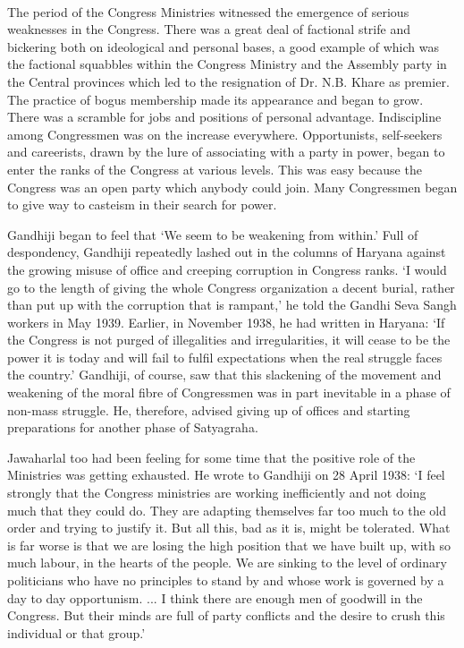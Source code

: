 \begin{multicols}{2}
\paragraph*{}
The period of the Congress Ministries witnessed the emergence of serious weaknesses in the Congress. There was a great deal of factional strife and bickering both on ideological and personal bases, a good example of which was the factional squabbles within the Congress Ministry and the Assembly party in the Central provinces which led to the resignation of Dr. N.B. Khare as premier. The practice of bogus membership made its appearance and began to grow. There was a scramble for jobs and positions of personal advantage. Indiscipline among Congressmen was on the increase everywhere. Opportunists, self-seekers and careerists, drawn by the lure of associating with a party in power, began to enter the ranks of the Congress at various levels. This was easy because the Congress was an open party which anybody could join. Many Congressmen began to give way to casteism in their search for power.

Gandhiji began to feel that `We seem to be weakening from within.' Full of despondency, Gandhiji repeatedly lashed out in the columns of Haryana against the growing misuse of office and creeping corruption in Congress ranks. `I would go to the length of giving the whole Congress organization a decent burial, rather than put up with the corruption that is rampant,' he told the Gandhi Seva Sangh workers in May 1939. Earlier, in November 1938, he had written in Haryana: `If the Congress is not purged of illegalities and irregularities, it will cease to be the power it is today and will fail to fulfil expectations when the real struggle faces the country.' Gandhiji, of course, saw that this slackening of the movement and weakening of the moral fibre of Congressmen was in part inevitable in a phase of non-mass struggle. He, therefore, advised giving up of offices and starting preparations for another phase of Satyagraha.

Jawaharlal too had been feeling for some time that the positive role of the Ministries was getting exhausted. He wrote to Gandhiji on 28 April 1938: `I feel strongly that the Congress ministries are working inefficiently and not doing much that they could do. They are adapting themselves far too much to the old order and trying to justify it. But all this, bad as it is, might be tolerated. What is far worse is that we are losing the high position that we have built up, with so much labour, in the hearts of the people. We are sinking to the level of ordinary politicians who have no principles to stand by and whose work is governed by a day to day opportunism. ... I think there are enough men of goodwill in the Congress. But their minds are full of party conflicts and the desire to crush this individual or that group.'


\end{multicols}
